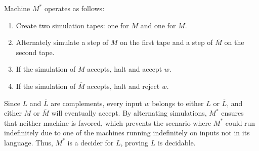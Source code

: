 \documentclass{article}
\begin{document}
Machine \( M^* \) operates as follows:
\begin{enumerate}
    \item Create two simulation tapes: one for \( M \) and one for \( \overline{M} \).
    \item Alternately simulate a step of \( M \) on the first tape and a step of \( \overline{M} \) on the second tape.
    \item If the simulation of \( M \) accepts, halt and accept \( w \).
    \item If the simulation of \( \overline{M} \) accepts, halt and reject \( w \).
\end{enumerate}

Since \( L \) and \( \overline{L} \) are complements, every input \( w \) belongs to either \( L \) or \( \overline{L} \), and either \( M \) or \( \overline{M} \) will eventually accept. By alternating simulations, \( M^* \) ensures that neither machine is favored, which prevents the scenario where \( M^* \) could run indefinitely due to one of the machines running indefinitely on inputs not in its language. Thus, \( M^* \) is a decider for \( L \), proving \( L \) is decidable.
\end{document}
